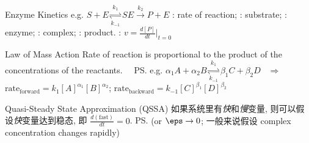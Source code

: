\documentclass{note}
\begin{document}
\vspace{-5pt}
\begin{MyTh}{Enzyme Kinetics}
    {\footnotesize e.g. $S+E\underset{k_{-1}}{\stackrel{k_1}{\rightleftharpoons}}SE\stackrel{k_2}{\rightarrow}P+E$} \quad {}: rate of reaction; : substrate; : enzyme; : complex; : product. \quad {}: $v=\frac{d[P]}{dt}|_{t=0}$
\end{MyTh}

\vspace{-8pt}
\begin{MyTh}{Law of Mass Action}
    \tiny Rate of reaction is proportional to the product of the concentrations of the reactants. \ \ \ps{\tiny e.g. $\alpha_1 A+\alpha_2 B\underset{k_{-1}}{\stackrel{k_1}{\rightleftharpoons}}\beta_1 C+\beta_2 D$ \ $\Rightarrow$ \ $\text{rate}_{\text{forward}}=k_1[A]^{\alpha_1}[B]^{\alpha_2}$; $\text{rate}_{\text{backward}}=k_{-1}[C]^{\beta_1}[D]^{\beta_2}$}
\end{MyTh}

\vspace{-5pt}
\begin{MyTh}{Quasi-Steady State Approximation (QSSA)}
    \tiny 如果系统里有\textit{快}和\textit{慢}变量, 则可以假设\textit{快}变量达到稳态, 即 $\frac{d(\text{fast})}{dt}=0$. \ps{\tiny (or $\eps\to0$; 一般来说假设 complex concentration changes rapidly)}
\end{MyTh}
\end{document}
